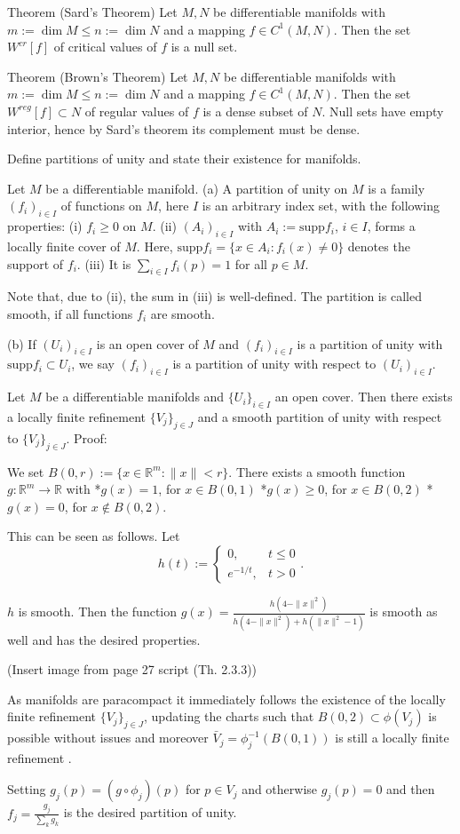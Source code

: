 Theorem (Sard's Theorem)
Let \(M, N\) be differentiable manifolds with \(m := \dim M \leq n := \dim N\) and a 
mapping \(f \in C^1(M, N)\). Then the set \(W^{cr}[f]\) of critical values of \(f\) is a null set.

Theorem (Brown's Theorem)
Let \(M, N\) be differentiable manifolds with \(m := \dim M \leq n := \dim N\) and a mapping \(f \in C^1(M, N)\). 
Then the set \(W^{reg}[f] \subset N\) of regular values of \(f\) is a dense subset of \(N\).
Null sets have empty interior, hence by Sard's theorem its complement must be dense.


Define partitions of unity and state their existence for
manifolds.

Let \(M\) be a differentiable manifold.
(a) A partition of unity on \(M\) is a family \((f_i)_{i \in I}\) of functions on \(M\), here \(I\) is an arbitrary index set, with the following properties:
(i) \(f_i \geq 0\) on \(M\).
(ii) \((A_i)_{i \in I}\) with \(A_i := \text{supp} f_i\), \(i \in I\), forms a locally finite cover of \(M\). Here, \(\text{supp} f_i = \{x \in A_i : f_i(x) \neq 0\}\) denotes the support of \(f_i\).
(iii) It is \(\sum_{i \in I} f_i(p) = 1\) for all \(p \in M\).

Note that, due to (ii), the sum in (iii) is well-defined.
The partition is called smooth, if all functions \(f_i\) are smooth.

(b) If \((U_i)_{i \in I}\) is an open cover of \(M\) and \((f_i)_{i \in I}\) is a partition of unity with \(\text{supp} f_i \subset U_i\), we say \((f_i)_{i \in I}\) is a partition of unity with respect to \((U_i)_{i \in I}\).

Let \( M \) be a differentiable manifolds and \( \{U_i\}_{i \in I}\) an open cover. Then there exists a locally finite refinement \( \{V_j\}_{j \in J}\)
and a smooth partition of unity with respect to \( \{V_j\}_{j \in J} \).
Proof:

We set \(B(0,r) := \{x \in \mathbb{R}^m : \|x\| < r\}\). There exists a smooth function \(g: \mathbb{R}^m \to \mathbb{R}\) with
*\(g(x) = 1\), for \(x \in B(0,1)\)
*\(g(x) \geq 0\), for \(x \in B(0,2)\)
*\(g(x) = 0\), for \(x \notin B(0,2)\).

This can be seen as follows. Let 
\[h(t) := 
\begin{cases}
0, & t \leq 0 \\
e^{-1/t}, & t > 0
\end{cases}.
\]

\(h\) is smooth. Then the function 
\( g(x) = \frac{h(4 - \|x\|^2)}{h(4 - \|x\|^2) + h(\|x\|^2 - 1)} \)
is smooth as well and has the desired properties.

(Insert image from page 27 script (Th. 2.3.3))

As manifolds are paracompact it immediately follows the existence of the locally finite refinement \( \{V_j\}_{j \in J}\),
updating the charts such that \( B(0, 2) \subset \phi(V_j) \) is possible without issues and moreover
\( \bar{V}_j = \phi^{-1}_j(B(0, 1)) \) is still a locally finite refinement .

Setting \( g_j(p) = (g \circ \phi_j)(p) \) for \( p \in V_j \) and otherwise \( g_j(p) = 0 \) and then \( f_j = \frac{g_j}{\sum_k g_k} \)
is the desired partition of unity.
